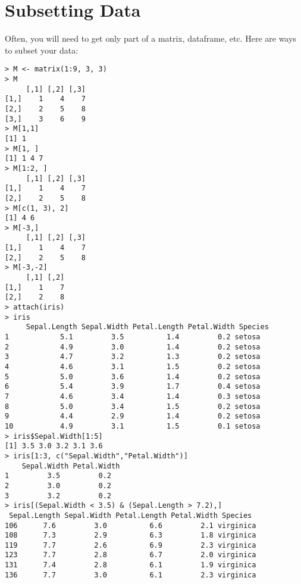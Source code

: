 \section{Subsetting Data}
Often, you will need to get only part of a matrix, dataframe, etc. Here 
are ways to subset your data:
\begin{snugshade}
\footnotesize
\begin{verbatim}
> M <- matrix(1:9, 3, 3)
> M
	 [,1] [,2] [,3]
[1,]    1    4    7
[2,]    2    5    8
[3,]    3    6    9
> M[1,1]
[1] 1
> M[1, ]
[1] 1 4 7
> M[1:2, ]
	 [,1] [,2] [,3]
[1,]    1    4    7
[2,]    2    5    8
> M[c(1, 3), 2]
[1] 4 6
> M[-3,]
	 [,1] [,2] [,3]
[1,]    1    4    7
[2,]    2    5    8
> M[-3,-2]
	 [,1] [,2]
[1,]    1    7
[2,]    2    8
> attach(iris)
> iris
	 Sepal.Length Sepal.Width Petal.Length Petal.Width Species
1            5.1         3.5          1.4         0.2 setosa
2            4.9         3.0          1.4         0.2 setosa
3            4.7         3.2          1.3         0.2 setosa
4            4.6         3.1          1.5         0.2 setosa
5            5.0         3.6          1.4         0.2 setosa
6            5.4         3.9          1.7         0.4 setosa
7            4.6         3.4          1.4         0.3 setosa
8            5.0         3.4          1.5         0.2 setosa
9            4.4         2.9          1.4         0.2 setosa
10           4.9         3.1          1.5         0.1 setosa
> iris$Sepal.Width[1:5]
[1] 3.5 3.0 3.2 3.1 3.6
> iris[1:3, c("Sepal.Width","Petal.Width")]
	Sepal.Width Petal.Width
1         3.5         0.2
2         3.0         0.2
3         3.2         0.2
> iris[(Sepal.Width < 3.5) & (Sepal.Length > 7.2),]
 Sepal.Length Sepal.Width Petal.Length Petal.Width Species
106      7.6         3.0          6.6         2.1 virginica
108      7.3         2.9          6.3         1.8 virginica
119      7.7         2.6          6.9         2.3 virginica
123      7.7         2.8          6.7         2.0 virginica
131      7.4         2.8          6.1         1.9 virginica
136      7.7         3.0          6.1         2.3 virginica
\end{verbatim}
\end{snugshade}

\noindent  
